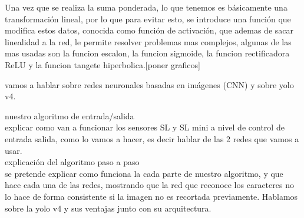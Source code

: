 Una vez que se realiza la suma ponderada, lo que tenemos es básicamente una transformación lineal, por lo que para evitar esto, se introduce una función que modifica estos datos, conocida como función de activación, que ademas de sacar linealidad a la red, le permite resolver problemas mas complejos, algunas de las mas usadas son la funcion escalon, la funcion sigmoide, la funcion rectificadora ReLU y la funcion tangete hiperbolica.[poner graficos]


vamos a hablar sobre redes neuronales basadas en imágenes (CNN) y sobre yolo v4.

nuestro algoritmo de entrada/salida \\

explicar como van a funcionar los sensores SL y SL mini a nivel de control de entrada salida,
como lo vamos a hacer, es decir hablar de las 2 redes que vamos a usar. \\



explicación del algoritmo paso a paso \\

se pretende explicar como funciona la cada parte de nuestro algoritmo, y que hace cada una de las redes, mostrando que la red que reconoce los caracteres no lo hace de forma consistente si la imagen no es recortada previamente. Hablamos sobre la yolo v4 y sus ventajas junto con su arquitectura.

